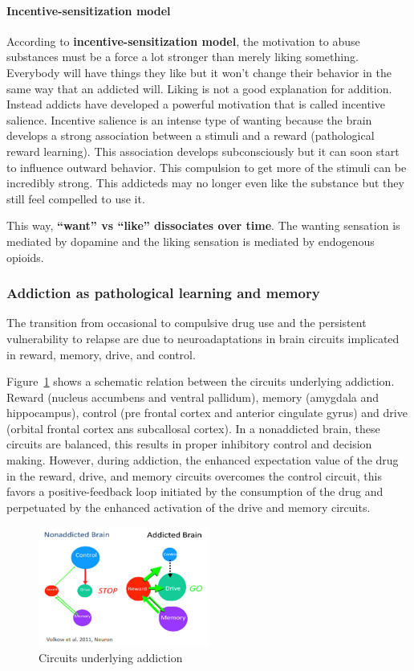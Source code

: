 \documentclass[12pt,article,oneside,a4paper]{memoir}
\begin{document}
\paragraph{Incentive-sensitization model}
According to \textbf{incentive-sensitization model}, the motivation to abuse
substances must be a force a lot stronger than merely liking something.
Everybody will have things they like but it won’t change their behavior in the
same way that an addicted will. Liking is not a good explanation for addition.
Instead addicts have developed a powerful motivation that is called incentive
salience. Incentive salience is an intense type of wanting because the brain
develops a strong association between a stimuli and a reward (pathological
reward learning). This association develops subconsciously but it can soon
start to influence outward behavior. This compulsion to get more of the stimuli
can be incredibly strong. This addicteds may no longer even like the substance
but they still feel compelled to use it.

This way, \textbf{``want'' vs ``like'' dissociates over time}. The wanting
sensation is mediated by dopamine and the liking sensation is mediated by
endogenous opioids.


\subsubsection{Addiction as pathological learning and memory}
The transition from occasional to compulsive drug use and the persistent
vulnerability to relapse are due to neuroadaptations in brain circuits
implicated in reward, memory, drive, and control.

Figure~\ref{fig:circuits-drug-addiction} shows a schematic relation between the
circuits underlying addiction. Reward (nucleus accumbens and ventral pallidum),
memory (amygdala and hippocampus), control (pre frontal cortex and anterior
cingulate gyrus) and drive (orbital frontal cortex ans subcallosal cortex). In
a nonaddicted brain, these circuits are balanced, this results in proper
inhibitory control and decision making. However, during addiction, the enhanced
expectation value of the drug in the reward, drive, and memory circuits
overcomes the control circuit, this favors a positive-feedback loop initiated by
the consumption of the drug and perpetuated by the enhanced activation of the
drive and memory circuits. 

\begin{figure}
  \centering
  \includegraphics[width=0.5\textwidth]{imgs/circuits-drug-addiction.png}
  \caption{Circuits underlying addiction}
  \label{fig:circuits-drug-addiction}
\end{figure}
\end{document}
